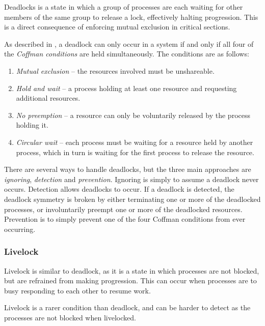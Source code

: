 Deadlocks is a state in which a group of processes are each waiting for other members of the same group to release a lock, effectively halting progression. This is a direct consequence of enforcing mutual exclusion in critical sections.

As described in \citet[page 239]{silberschatz2006operating}, a deadlock can only occur in a system if and only if all four of the \textit{Coffman conditions}\citep[First described][page 70]{coffman1971system} are held simultaneously. The conditions are as follows:

\begin{enumerate}[topsep=0em,itemsep=-1em,partopsep=0.5em,parsep=1em]
    \item \textit{Mutual exclusion} -- the resources involved must be unshareable.
    \item \textit{Hold and wait} -- a process holding at least one resource and requesting additional resources.
    \item \textit{No preemption} -- a resource can only be voluntarily released by the process holding it.
    \item \textit{Circular wait} -- each process must be waiting for a resource held by another process, which in turn is waiting for the first process to release the resource.
\end{enumerate}

There are several ways to handle deadlocks, but the three main approaches are \textit{ignoring}, \textit{detection} and \textit{prevention}. Ignoring is simply to assume a deadlock never occurs. Detection allows deadlocks to occur. If a deadlock is detected, the deadlock symmetry is broken by either terminating one or more of the deadlocked processes, or involuntarily preempt one or more of the deadlocked resources. Prevention is to simply prevent one of the four Coffman conditions from ever occurring.


\subsubsection{Livelock}

Livelock is similar to deadlock, as it is a state in which processes are not blocked, but are refrained from making progression. This can occur when processes are to busy responding to each other to resume work. 

Livelock is a rarer condition than deadlock, and can be harder to detect as the processes are not blocked when livelocked. 


